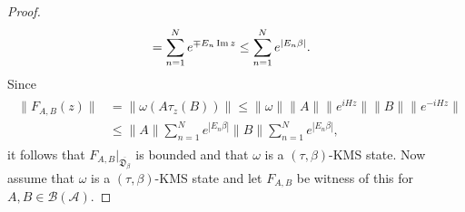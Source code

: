 \begin{proof}
\begin{align}
\begin{split}
&=\sum_{n=1}^N e^{\mp E_n \operatorname{Im} z}\leq \sum_{n=1}^N e^{|E_n\beta|}.
\end{split}
\end{align}  
Since 
\begin{align}
\begin{split}
\|F_{A,B}(z)\|&=\|\omega(A\tau_z(B))\|\leq\|\omega\|\|A\|\|e^{iHz}\|\|B\|\|e^{-iHz}\| \\
&\leq\|A\|\sum_{n=1}^N e^{|E_n\beta|}\|B\|\sum_{n=1}^N e^{|E_n\beta|},
\end{split}
\end{align}
it follows that $F_{A,B}|_{\overline{\mathfrak{D}_\beta}}$ is bounded and that $\omega$ is a $(\tau,\beta)$-KMS state.
Now assume that $\omega$ is a $(\tau,\beta)$-KMS state and let $F_{A,B}$ be witness of this for $A,B\in\mathcal{B}(\mathcal{A})$.
\end{proof}